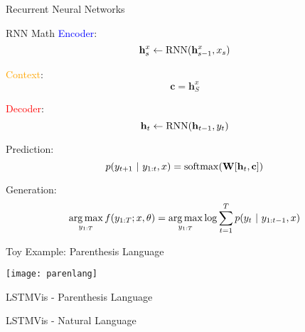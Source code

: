 \begin{frame}{Recurrent Neural Networks}
  \vspace{-0.25cm}

  \begin{center}
  \end{center}
\end{frame}


\begin{frame}{RNN Math}
  \textcolor{blue}{Encoder}:
  \[{\mathbf{h}^{x}_s \gets \operatorname*{RNN}(\mathbf{h}^{x}_{s-1}, x_s)} \]

  \textcolor{orange}{Context}:
  \[ {\mathbf{c}} = \mathbf{h}^{x}_S \]

  \textcolor{red}{Decoder}:
  \[{\mathbf{h}_t \gets \operatorname*{RNN}(\mathbf{h}_{t-1}, y_t)} \]

  Prediction:
  \[ p(y_{t+1}\  |\  y_{1:t}, x) = \operatorname*{softmax}( \mathbf{W} [\mathbf{h}_t, \mathbf{c}]) \]

  \pause

  Generation:
  \[ \argmax_{y_{1:T}} f(y_{1:T}; x, \theta) = \argmax_{y_{1:T}} \log \sum_{t=1}^T p(y_{t}\  |\  y_{1:t-1}, x) \]

\end{frame}

\begin{frame}{Toy Example: Parenthesis Language}
  \begin{center}
    \texttt{[image: parenlang]}
  \end{center}
\end{frame}

\begin{frame}{LSTMVis - Parenthesis Language}
  \vspace{-0.25cm}

  \begin{center}
  \end{center}
\end{frame}


\begin{frame}{LSTMVis - Natural Language}
  \vspace{-0.25cm}


  \begin{center}
  \end{center}
\end{frame}


